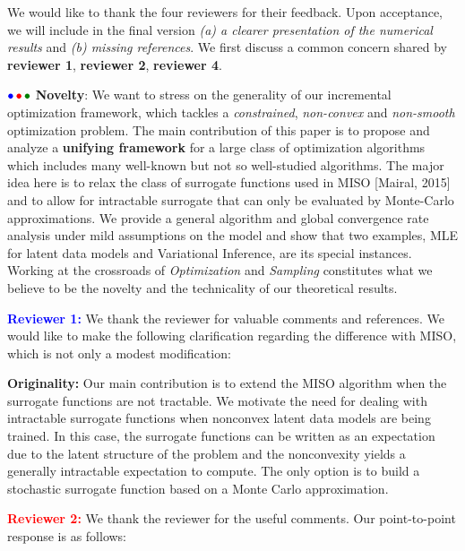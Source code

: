 \documentclass{article}
\begin{document}
We would like to thank the four reviewers for their feedback. Upon acceptance, we will include in the final version \emph{{\sf (a)} a clearer presentation of the numerical results} and \emph{{\sf (b)} missing references}. 
We first discuss a common concern shared by \textbf{\color{blue}reviewer 1}, \textbf{\color{red} reviewer 2},
\textbf{\color{green!50!black}reviewer 4}.\vspace{-5pt}

${\color{blue}\bullet}\!~{\color{red}\bullet}\!~{\color{green!50!black}\bullet}$ \textbf{Novelty}: 
We want to stress on the generality of our incremental optimization framework, which tackles a \emph{constrained}, \emph{non-convex} and \emph{non-smooth} optimization problem. 
The main contribution of this paper is to propose and analyze a \textbf{unifying framework} for a large class of optimization algorithms which includes many well-known but not so well-studied algorithms.
The major idea here is to relax the class of surrogate functions used in MISO [Mairal, 2015] and to allow for intractable surrogate that can only be evaluated by Monte-Carlo approximations.
We provide a general algorithm and global convergence rate analysis under mild assumptions on the model and show that two examples, MLE for latent data models and Variational Inference, are its special instances.
Working at the crossroads of \emph{Optimization} and \emph{Sampling} constitutes what we believe to be the novelty and the technicality of our theoretical results.


\textbf{\textcolor{blue}{Reviewer 1:}} We thank the reviewer for valuable comments and references. We would like to make the following clarification regarding the difference with MISO, which is not only a modest modification:\vspace{-5pt}

\textbf{Originality:} Our main contribution is to extend the MISO algorithm when the surrogate functions are not tractable. 
We motivate the need for dealing with intractable surrogate functions when nonconvex latent data models are being trained. 
In this case, the surrogate functions can be written as an expectation due to the latent structure of the problem and the nonconvexity yields a generally intractable expectation to compute. 
The only option is to build a stochastic surrogate function based on a Monte Carlo approximation.


\textbf{\textcolor{red}{Reviewer 2:}} We thank the reviewer for the useful comments. Our point-to-point response is as follows:\vspace{-5pt}
\end{document}
